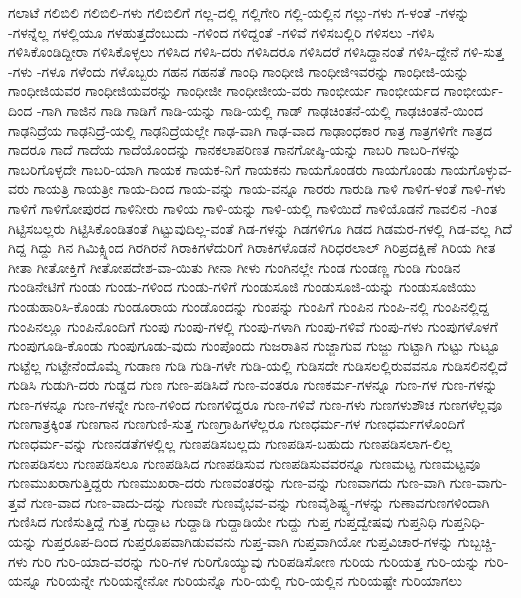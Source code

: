 {ಗಲಾಟೆ
ಗಲಿಬಿಲಿ
ಗಲಿಬಿಲಿ-ಗಳು
ಗಲಿಬಿಲಿಗೆ
ಗಲ್ಲ-ದಲ್ಲಿ
ಗಲ್ಲಿಗೇರಿ
ಗಲ್ಲಿ-ಯಲ್ಲಿನ
ಗಲ್ಲು-ಗಳು
ಗ-ಳಂತೆ
-ಗಳನ್ನು
-ಗಳನ್ನೆಲ್ಲ
ಗಳಲ್ಲಿಯೂ
ಗಳಹುತ್ತದೆಂಬುದು
-ಗಳಿಂದ
ಗಳಿದ್ದಂತೆ
-ಗಳಿವೆ
ಗಳಿಸಬಲ್ಲಿರಿ
ಗಳಿಸಲು
-ಗಳಿಸಿ
ಗಳಿಸಿಕೊಂಡಿದ್ದೀರಾ
ಗಳಿಸಿಕೊಳ್ಳಲು
ಗಳಿಸಿದ
ಗಳಿಸಿ-ದರು
ಗಳಿಸಿದರೂ
ಗಳಿಸಿದರೆ
ಗಳಿಸಿದ್ದಾನಂತೆ
ಗಳಿಸಿ-ದ್ದೇನೆ
ಗಳಿ-ಸುತ್ತ
-ಗಳು
-ಗಳೂ
ಗಳೆಂದು
ಗಳೊಬ್ಬರು
ಗಹನ
ಗಹನತೆ
ಗಾಂಧಿ
ಗಾಂಧೀಜಿ
ಗಾಂಧೀಜಿಇವರನ್ನು
ಗಾಂಧೀಜಿ-ಯನ್ನು
ಗಾಂಧೀಜಿಯವರ
ಗಾಂಧೀಜಿಯವರನ್ನು
ಗಾಂಧೀಜೀ
ಗಾಂಧೀಜೀಯ-ವರು
ಗಾಂಭೀರ್ಯ
ಗಾಂಭೀರ್ಯದ
ಗಾಂಭೀರ್ಯ-ದಿಂದ
-ಗಾಗಿ
ಗಾಜಿನ
ಗಾಡಿ
ಗಾಡಿಗೆ
ಗಾಡಿ-ಯನ್ನು
ಗಾಡಿ-ಯಲ್ಲಿ
ಗಾಡ್
ಗಾಢಚಿಂತನೆ-ಯಲ್ಲಿ
ಗಾಢಚಿಂತನೆ-ಯಿಂದ
ಗಾಢನಿದ್ರೆಯ
ಗಾಢನಿದ್ರೆ-ಯಲ್ಲಿ
ಗಾಢನಿದ್ರೆಯಲ್ಲೇ
ಗಾಢ-ವಾಗಿ
ಗಾಢ-ವಾದ
ಗಾಢಾಂಧಕಾರ
ಗಾತ್ರ
ಗಾತ್ರಗಳಿಗೇ
ಗಾತ್ರದ
ಗಾದರೂ
ಗಾದೆ
ಗಾದೆಯ
ಗಾದೆಯೊಂದನ್ನು
ಗಾನಕಲಾಪರಿಣತ
ಗಾನಗೋಷ್ಠಿ-ಯನ್ನು
ಗಾಬರಿ
ಗಾಬರಿ-ಗಳನ್ನು
ಗಾಬರಿಗೊಳ್ಳದೇ
ಗಾಬರಿ-ಯಾಗಿ
ಗಾಯಕ
ಗಾಯಕ-ನಿಗೆ
ಗಾಯಕನು
ಗಾಯಗೊಂಡರು
ಗಾಯಗೊಂಡು
ಗಾಯಗೊಳ್ಳುವ-ವರು
ಗಾಯತ್ರಿ
ಗಾಯತ್ರೀ
ಗಾಯ-ದಿಂದ
ಗಾಯ-ವನ್ನು
ಗಾಯ-ವನ್ನೂ
ಗಾರರು
ಗಾರುಡಿ
ಗಾಳಿ
ಗಾಳಿಗ-ಳಂತೆ
ಗಾಳಿ-ಗಳು
ಗಾಳಿಗೆ
ಗಾಳಿಗೋಪುರದ
ಗಾಳಿನೀರು
ಗಾಳಿಯ
ಗಾಳಿ-ಯನ್ನು
ಗಾಳಿ-ಯಲ್ಲಿ
ಗಾಳಿಯಿದೆ
ಗಾಳಿಯೊಡನೆ
ಗಾವಲಿನ
-ಗಿಂತ
ಗಿಟ್ಟಿಸಬಲ್ಲರು
ಗಿಟ್ಟಿಸಿಕೊಂಡಿತಂತೆ
ಗಿಟ್ಟುವುದಿಲ್ಲ-ವಂತೆ
ಗಿಡ-ಗಳನ್ನು
ಗಿಡಗಳಿಗೂ
ಗಿಡದ
ಗಿಡಮರ-ಗಳಲ್ಲಿ
ಗಿಡ-ವಲ್ಲ
ಗಿದೆ
ಗಿದ್ದ
ಗಿದ್ದು
ಗಿನ
ಗಿಮಿಕ್ಸ್ನಿಂದ
ಗಿರಗಿರನೆ
ಗಿರಾಕಿಗಳೆದುರಿಗೆ
ಗಿರಾಕಿಗಳೊಡನೆ
ಗಿರಿಧರಲಾಲ್
ಗಿರಿಪ್ರದಕ್ಷಿಣೆ
ಗಿರಿಯ
ಗೀತ
ಗೀತಾ
ಗೀತೋಕ್ತಿಗೆ
ಗೀತೋಪದೇಶ-ವಾ-ಯಿತು
ಗೀನಾ
ಗೀಳು
ಗುಂಗಿನಲ್ಲೇ
ಗುಂಡ
ಗುಂಡಣ್ಣ
ಗುಂಡಿ
ಗುಂಡಿನ
ಗುಂಡಿನೇಟಿಗೆ
ಗುಂಡು
ಗುಂಡು-ಗಳಿಂದ
ಗುಂಡು-ಗಳಿಗೆ
ಗುಂಡುಸೂಜಿ
ಗುಂಡುಸೂಜಿ-ಯನ್ನು
ಗುಂಡುಸೂಜಿಯು
ಗುಂಡುಹಾರಿಸಿ-ಕೊಂಡು
ಗುಂಡೂರಾಯ
ಗುಂಡೊಂದನ್ನು
ಗುಂಪನ್ನು
ಗುಂಪಿಗೆ
ಗುಂಪಿನ
ಗುಂಪಿ-ನಲ್ಲಿ
ಗುಂಪಿನಲ್ಲಿದ್ದ
ಗುಂಪಿನಲ್ಲೂ
ಗುಂಪಿನೊಂದಿಗೆ
ಗುಂಪು
ಗುಂಪು-ಗಳಲ್ಲಿ
ಗುಂಪು-ಗಳಾಗಿ
ಗುಂಪು-ಗಳಿವೆ
ಗುಂಪು-ಗಳು
ಗುಂಪುಗಳೊಳಗೆ
ಗುಂಪುಗೂಡಿ-ಕೊಂಡು
ಗುಂಪುಗೂಡು-ವುದು
ಗುಂಪೊಂದು
ಗುಜರಾತಿನ
ಗುಜ್ಜಾಗುವ
ಗುಜ್ಜು
ಗುಟ್ಟಾಗಿ
ಗುಟ್ಟು
ಗುಟ್ಟೂ
ಗುಟ್ಟೆಲ್ಲ
ಗುಟ್ಟೇನೆಂದೊಮ್ಮೆ
ಗುಡಾಣ
ಗುಡಿ
ಗುಡಿ-ಗಳೇ
ಗುಡಿ-ಯಲ್ಲಿ
ಗುಡಿಸದೇ
ಗುಡಿಸಲಲ್ಲಿರುವವನೂ
ಗುಡಿಸಲಿನಲ್ಲಿದೆ
ಗುಡಿಸಿ
ಗುಡುಗಿ-ದರು
ಗುಡ್ಡದ
ಗುಣ
ಗುಣ-ಪಡಿಸಿದೆ
ಗುಣ-ವಂತರೂ
ಗುಣಕರ್ಮ-ಗಳನ್ನೂ
ಗುಣ-ಗಳ
ಗುಣ-ಗಳನ್ನು
ಗುಣ-ಗಳನ್ನೂ
ಗುಣ-ಗಳನ್ನೇ
ಗುಣ-ಗಳಿಂದ
ಗುಣಗಳಿದ್ದರೂ
ಗುಣ-ಗಳಿವೆ
ಗುಣ-ಗಳು
ಗುಣಗಳುಶೌಚ
ಗುಣಗಳೆಲ್ಲವೂ
ಗುಣಗಾತ್ರಕ್ಕಿಂತ
ಗುಣಗಾನ
ಗುಣಗುಣಿ-ಸುತ್ತ
ಗುಣಗ್ರಾಹಿಗಳೆಲ್ಲರೂ
ಗುಣಧರ್ಮ-ಗಳ
ಗುಣಧರ್ಮಗಳೊಂದಿಗೆ
ಗುಣಧರ್ಮ-ವನ್ನು
ಗುಣನಡತೆಗಳಲ್ಲಿಲ್ಲ
ಗುಣಪಡಿಸಬಲ್ಲದು
ಗುಣಪಡಿಸ-ಬಹುದು
ಗುಣಪಡಿಸಲಾಗ-ಲಿಲ್ಲ
ಗುಣಪಡಿಸಲು
ಗುಣಪಡಿಸಲೂ
ಗುಣಪಡಿಸಿದ
ಗುಣಪಡಿಸುವ
ಗುಣಪಡಿಸುವವರನ್ನೂ
ಗುಣಮಟ್ಟ
ಗುಣಮಟ್ಟವೂ
ಗುಣಮುಖರಾಗುತ್ತಿದ್ದರು
ಗುಣಮುಖರಾ-ದರು
ಗುಣವಂತರನ್ನು
ಗುಣ-ವನ್ನು
ಗುಣವಾಗದು
ಗುಣ-ವಾಗಿ
ಗುಣ-ವಾಗು-ತ್ತವೆ
ಗುಣ-ವಾದ
ಗುಣ-ವಾದು-ದನ್ನು
ಗುಣವೇ
ಗುಣವೈಭವ-ವನ್ನು
ಗುಣವೈಶಿಷ್ಟ್ಯ-ಗಳನ್ನು
ಗುಣಾವಗುಣಗಳಿಂದಾಗಿ
ಗುಣಿಸಿದ
ಗುಣಿಸುತ್ತಿದ್ದೆ
ಗುತ್ತ
ಗುದ್ದಾಟ
ಗುದ್ದಾಡಿ
ಗುದ್ದಾಡಿಯೇ
ಗುದ್ದು
ಗುಪ್ತ
ಗುಪ್ತದ್ವೇಷವು
ಗುಪ್ತನಿಧಿ
ಗುಪ್ತನಿಧಿ-ಯನ್ನು
ಗುಪ್ತರೂಪ-ದಿಂದ
ಗುಪ್ತರೂಪವಾಗಿಡುವವನು
ಗುಪ್ತ-ವಾಗಿ
ಗುಪ್ತವಾಗಿಯೋ
ಗುಪ್ತವಿಚಾರ-ಗಳನ್ನು
ಗುಬ್ಬಚ್ಚಿ-ಗಳು
ಗುರಿ
ಗುರಿ-ಯಾದ-ವರನ್ನು
ಗುರಿ-ಗಳ
ಗುರಿಗೊಯ್ಯುವು
ಗುರಿಪಡಿಸೋಣ
ಗುರಿಯ
ಗುರಿಯತ್ತ
ಗುರಿ-ಯನ್ನು
ಗುರಿ-ಯನ್ನೂ
ಗುರಿಯನ್ನೇ
ಗುರಿಯನ್ನೇನೋ
ಗುರಿಯನ್ನೊ
ಗುರಿ-ಯಲ್ಲಿ
ಗುರಿ-ಯಲ್ಲಿನ
ಗುರಿಯಷ್ಟೇ
ಗುರಿಯಾಗಲು
}
